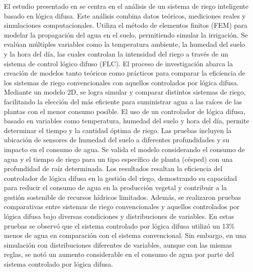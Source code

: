 \bigbreak
El estudio presentado en \cite{neugebauer_fuzzy_2023} se centra en el análisis de un sistema de riego inteligente basado en lógica difusa. Este análisis combina datos teóricos, mediciones reales y simulaciones computacionales. Utiliza el método de elementos finitos (FEM) para modelar la propagación del agua en el suelo, permitiendo simular la irrigación. Se evalúan múltiples variables como la temperatura ambiente, la humedad del suelo y la hora del día, las cuales controlan la intensidad del riego a través de un sistema de control lógico difuso (FLC). El proceso de investigación abarca la creación de modelos tanto teóricos como prácticos para comparar la eficiencia de los sistemas de riego convencionales con aquellos controlados por lógica difusa. Mediante un modelo 2D, se logra simular y comparar distintos sistemas de riego, facilitando la elección del más eficiente para suministrar agua a las raíces de las plantas con el menor consumo posible. El uso de un controlador de lógica difusa, basado en variables como temperatura, humedad del suelo y hora del día, permite determinar el tiempo y la cantidad óptima de riego. Las pruebas incluyen la ubicación de sensores de humedad del suelo a diferentes profundidades y su impacto en el consumo de agua. Se valida el modelo considerando el consumo de agua y el tiempo de riego para un tipo específico de planta (césped) con una profundidad de raíz determinada. Los resultados resaltan la eficiencia del controlador de lógica difusa en la gestión del riego, demostrando su capacidad para reducir el consumo de agua en la producción vegetal y contribuir a la gestión sostenible de recursos hídricos limitados. Además, se realizaron pruebas comparativas entre sistemas de riego convencionales y aquellos controlados por lógica difusa bajo diversas condiciones y distribuciones de variables. En estas pruebas se observó que el sistema controlado por lógica difusa utilizó un 13\% menos de agua en comparación con el sistema convencional. Sin embargo, en una simulación con distribuciones diferentes de variables, aunque con las mismas reglas, se notó un aumento considerable en el consumo de agua por parte del sistema controlado por lógica difusa.

